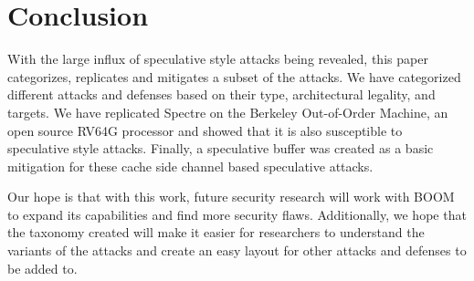 \section{Conclusion}

With the large influx of speculative style attacks being revealed, this paper categorizes,
replicates and mitigates a subset of the attacks. We have categorized different attacks 
and defenses based on their type, architectural legality, and targets. We have replicated 
Spectre on the Berkeley Out-of-Order Machine, an open source RV64G processor and showed 
that it is also susceptible to speculative style attacks. Finally, a speculative buffer 
was created as a basic mitigation for these cache side channel based speculative attacks.

Our hope is that with this work, future security research will work with BOOM to expand
its capabilities and find more security flaws. Additionally, we hope that the taxonomy
created will make it easier for researchers to understand the variants of the attacks
and create an easy layout for other attacks and defenses to be added to.
